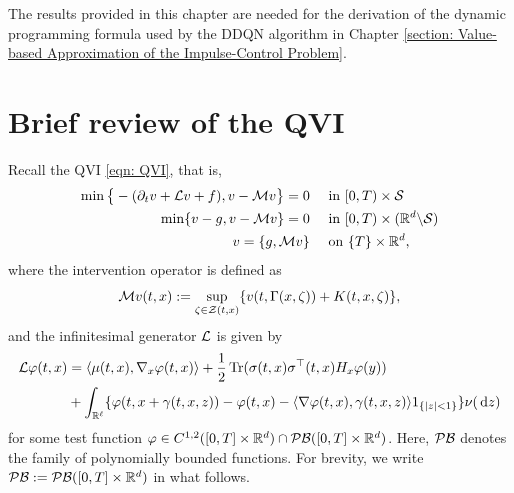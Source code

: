 \label{appendix: Auxiliary Results for Dynamic Programming}
The results provided in this chapter are needed for the derivation of the dynamic programming formula used by the DDQN algorithm in Chapter \ref{section: Value-based Approximation of the Impulse-Control Problem}. %

\section{Brief review of the QVI}
\label{appendix: Brief review of the QVI}
Recall the QVI \eqref{eqn: QVI}, that is, 
\begin{align}
    \min\big\{ - (\partial_t v + \mathcal{L} v + f), v - \mathcal{M} v \big\} = 0& \quad \text{ in } [0,T) \times \mathcal{S} \label{eqn: QVI RL I Appendix} \\
    \min \{v - g, v - \mathcal{M} v \} = 0 & \quad \text{ in } [0,T) \times (\mathbb{R}^d \backslash \mathcal{S}) \label{eqn: QVI RL II Appendix} \\
    v = \{g, \mathcal{M} v\} & \quad \text{ on } \{T\} \times \mathbb{R}^d \label{eqn: QVI RL III Appendix},
\end{align}
where the intervention operator is defined as
\begin{equation*}
    \mathcal{M} v(t,x) := \sup_{\zeta \in \mathcal{Z}(t,x)} \{v(t,\Gamma(x,\zeta)) + K(t,x,\zeta)\},
\end{equation*}
and the infinitesimal generator $\mathcal{L}$ is given by
\begin{align}
    \mathcal{L} \varphi(t,x) &= \langle \mu(t,x), \nabla_x \varphi(t,x) \rangle + \frac{1}{2} \operatorname{Tr} (\sigma(t,x)\sigma^\top(t,x)H_x \varphi(y)) \nonumber\\
    &+ \int_{\mathbb{R}^\ell} \{\varphi(t,x+\gamma(t,x,z)) - \varphi(t,x) - \langle \nabla \varphi(t,x), \gamma(t,x,z) \rangle 1_{\left\{|z|<1\right\}}\} \nu(\,\mathrm{d} z)
    \label{C: infinitesimal generator}
\end{align}
for some test function $\varphi \in C^{1,2}([0,T]\times \mathbb{R}^d) \cap \mathcal{PB}([0,T]\times \mathbb{R}^d)$. Here, $\mathcal{PB}$ denotes the family of polynomially bounded functions. For brevity, we write $\mathcal{PB}:=\mathcal{PB}([0,T]\times \mathbb{R}^d)$ in what follows. 

